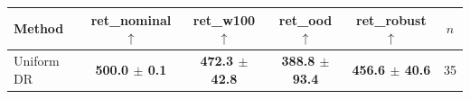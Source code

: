 \begin{tabular}{lccccc}
\toprule
Method & ret\_nominal $\uparrow$ & ret\_w100 $\uparrow$ & ret\_ood $\uparrow$ & ret\_robust $\uparrow$ & $n$ \\
\midrule
Uniform DR & \textbf{500.0 $\pm$ 0.1} & \textbf{472.3 $\pm$ 42.8} & \textbf{388.8 $\pm$ 93.4} & \textbf{456.6 $\pm$ 40.6} & 35 \\
\bottomrule
\end{tabular}

